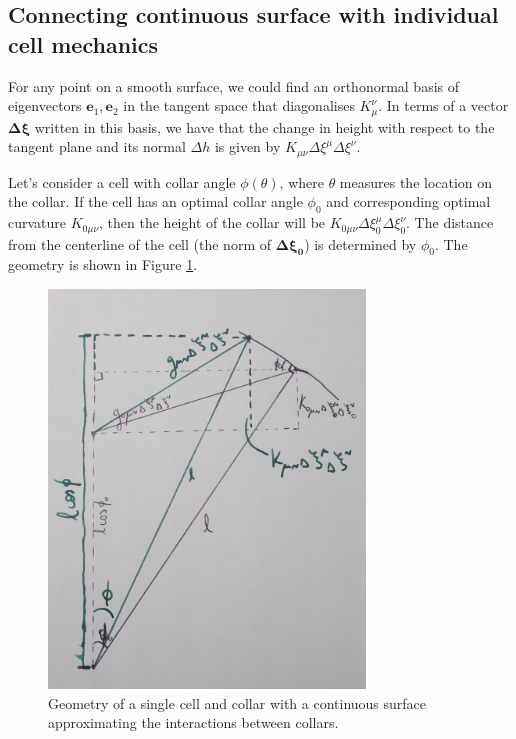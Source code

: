 \documentclass[draft]{article}
\begin{document}
\subsection{Connecting continuous surface with individual cell mechanics}

For any point on a smooth surface, we could find an orthonormal basis of eigenvectors $\bm{e}_1, \bm{e}_2$ in the tangent space that diagonalises $K_\mu^\nu$. In terms of a vector $\bm{\Delta \xi}$ written in this basis, we have that the change in height with respect to the tangent plane and its normal $\Delta h$ is given by $K_{\mu\nu}\Delta\xi^\mu\Delta\xi^\nu$.

Let's consider a cell with collar angle $\phi(\theta)$, where $\theta$ measures the location on the collar. If the cell has an optimal collar angle $\phi_0$ and corresponding optimal curvature $K_{0\mu\nu}$, then the height of the collar will be $K_{0\mu\nu}\Delta\xi_0^\mu\Delta\xi_0^\nu$. The distance from the centerline of the cell (the norm of $\bm{\Delta\xi_0}$) is determined by $\phi_0$. The geometry is shown in Figure \ref{fig:geom}.

\begin{figure}[htbp]
    \centering
    \includegraphics[width=0.75\textwidth]{figures/geom.jpg}
    \caption{Geometry of a single cell and collar with a continuous surface approximating the interactions between collars.}
    \label{fig:geom}
\end{figure}
\end{document}
